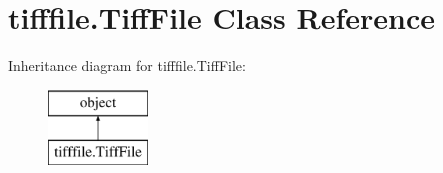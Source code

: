 \hypertarget{classtifffile_1_1TiffFile}{\section{tifffile.\-Tiff\-File Class Reference}
\label{classtifffile_1_1TiffFile}
}
Inheritance diagram for tifffile.\-Tiff\-File\-:\begin{figure}[H]
\begin{center}
\leavevmode
\includegraphics[height=2.000000cm]{classtifffile_1_1TiffFile}
\end{center}
\end{figure}
